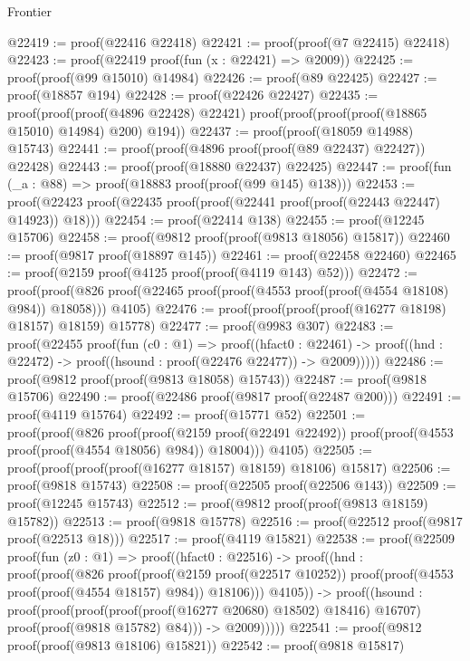 \begin{lexlean}{Frontier}
\begin{coremodule}
@22419 := proof(@22416 @22418)
@22421 := proof(proof(@7 @22415) @22418)
@22423 := proof(@22419 proof(fun (x : @22421) => @2009))
@22425 := proof(proof(@99 @15010) @14984)
@22426 := proof(@89 @22425)
@22427 := proof(@18857 @194)
@22428 := proof(@22426 @22427)
@22435 := proof(proof(proof(@4896 @22428) @22421)
      proof(proof(proof(proof(@18865 @15010) @14984) @200) @194))
@22437 := proof(proof(@18059 @14988) @15743)
@22441 := proof(proof(@4896 proof(proof(@89 @22437) @22427)) @22428)
@22443 := proof(proof(@18880 @22437) @22425)
@22447 := proof(fun (_a : @88) => proof(@18883 proof(proof(@99 @145) @138)))
@22453 := proof(@22423 proof(@22435 proof(proof(@22441 proof(proof(@22443 @22447) @14923)) @18)))
@22454 := proof(@22414 @138)
@22455 := proof(@12245 @15706)
@22458 := proof(@9812 proof(proof(@9813 @18056) @15817))
@22460 := proof(@9817 proof(@18897 @145))
@22461 := proof(@22458 @22460)
@22465 := proof(@2159 proof(@4125 proof(proof(@4119 @143) @52)))
@22472 := proof(proof(@826 proof(@22465 proof(proof(@4553 proof(proof(@4554 @18108) @984)) @18058)))
      @4105)
@22476 := proof(proof(proof(proof(@16277 @18198) @18157) @18159) @15778)
@22477 := proof(@9983 @307)
@22483 := proof(@22455
      proof(fun (c0 : @1) =>
        proof((hfact0 : @22461) ->
          proof((hnd : @22472) -> proof((hsound : proof(@22476 @22477)) -> @2009)))))
@22486 := proof(@9812 proof(proof(@9813 @18058) @15743))
@22487 := proof(@9818 @15706)
@22490 := proof(@22486 proof(@9817 proof(@22487 @200)))
@22491 := proof(@4119 @15764)
@22492 := proof(@15771 @52)
@22501 := proof(proof(@826
        proof(proof(@2159 proof(@22491 @22492))
            proof(proof(@4553 proof(proof(@4554 @18056) @984)) @18004)))
      @4105)
@22505 := proof(proof(proof(proof(@16277 @18157) @18159) @18106) @15817)
@22506 := proof(@9818 @15743)
@22508 := proof(@22505 proof(@22506 @143))
@22509 := proof(@12245 @15743)
@22512 := proof(@9812 proof(proof(@9813 @18159) @15782))
@22513 := proof(@9818 @15778)
@22516 := proof(@22512 proof(@9817 proof(@22513 @18)))
@22517 := proof(@4119 @15821)
@22538 := proof(@22509
      proof(fun (z0 : @1) =>
        proof((hfact0 : @22516) ->
          proof((hnd : proof(proof(@826
                  proof(proof(@2159 proof(@22517 @10252))
                      proof(proof(@4553 proof(proof(@4554 @18157) @984)) @18106)))
                @4105)) ->
            proof((hsound : proof(proof(proof(proof(proof(@16277 @20680) @18502) @18416) @16707)
                  proof(proof(@9818 @15782) @84))) ->
              @2009)))))
@22541 := proof(@9812 proof(proof(@9813 @18106) @15821))
@22542 := proof(@9818 @15817)

\end{coremodule}
\end{lexlean}
